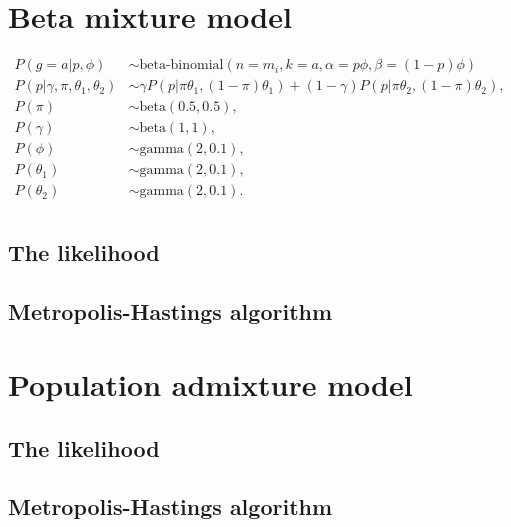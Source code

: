 \documentclass[11pt,english,letterpaper,oneside]{article}
\begin{document}
\section{Beta mixture model}

\begin{align*}
P(g=a|p,\phi) &\sim \text{beta-binomial}(n=m_i, k = a, \alpha = p\phi, \beta = (1-p)\phi) \\
P(p|\gamma, \pi, \theta_1, \theta_2) &\sim \gamma P(p|\pi\theta_1, (1-\pi)\theta_1) + (1-\gamma)P(p|\pi\theta_2, (1-\pi)\theta_2), \\
P(\pi) &\sim \text{beta}(0.5, 0.5), \\
P(\gamma) &\sim \text{beta}(1,1), \\
P(\phi) &\sim \text{gamma}(2,0.1), \\
P(\theta_1) &\sim \text{gamma}(2,0.1), \\
P(\theta_2) &\sim \text{gamma}(2,0.1). \\
\end{align*}

\subsection{The likelihood}

\subsection{Metropolis-Hastings algorithm}

\section{Population admixture model}

\subsection{The likelihood}

\subsection{Metropolis-Hastings algorithm}
\end{document}
